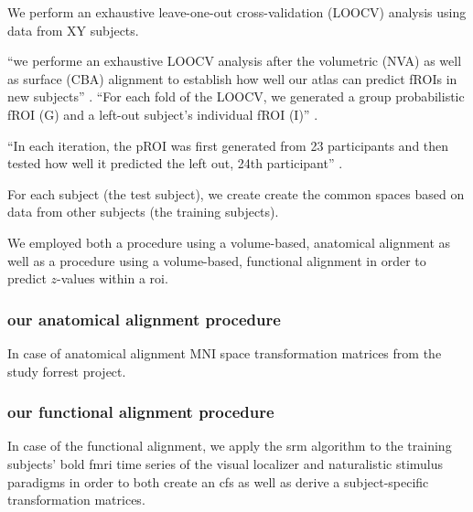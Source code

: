 We perform an exhaustive leave-one-out cross-validation (LOOCV) analysis using
data from XY subjects.

%
``we performe an exhaustive LOOCV analysis after the volumetric (NVA) as well as
surface (CBA) alignment to establish how well our atlas can predict fROIs in new
subjects'' \citep{rosenke2021probabilistic}.
%
``For each fold of the LOOCV, we generated a group probabilistic fROI (G) and a
left-out subject's individual fROI (I)'' \citep{rosenke2021probabilistic}.

``In each iteration, the pROI was first generated from 23 participants and then
tested how well it predicted the left out, 24th participant''
\citep{weiner2018defining}.

For each subject (the test subject), we create create the common spaces based on
data from other subjects (the training subjects).

We employed both a procedure using a volume-based, anatomical alignment as well
as a procedure using a volume-based, functional alignment in order to predict
$z$-values within a \ac{roi}.



\subsubsection{our anatomical alignment procedure}


%
In case of anatomical alignment
%
MNI space
%
transformation matrices from the study forrest project.



\subsubsection{our functional alignment procedure}




%
In case of the functional alignment, we apply the \ac{srm} algorithm
\citep{chen2015reduced, richard2019fast} to the training subjects' \ac{bold}
\ac{fmri} time series of the visual localizer and naturalistic stimulus
paradigms in order to both create an \ac{cfs} as well as derive a
subject-specific transformation matrices.


